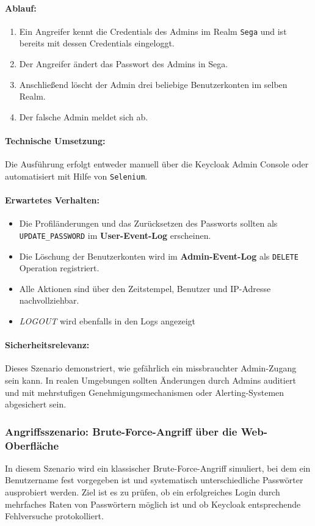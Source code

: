 \documentclass[a4paper,12pt]{article}
\begin{document}
	\paragraph{Ablauf:}
	\begin{enumerate}
		\item Ein Angreifer kennt die Credentials des Admins im Realm \texttt{Sega} und ist bereits mit dessen Credentials eingeloggt.
		\item Der Angreifer ändert das Passwort des Admins in Sega.
		\item Anschließend löscht der Admin drei beliebige Benutzerkonten im selben Realm.
		\item Der falsche Admin meldet sich ab.
	\end{enumerate}
	
	\paragraph{Technische Umsetzung:}
	Die Ausführung erfolgt entweder manuell über die Keycloak Admin Console oder automatisiert mit Hilfe von \texttt{Selenium}.
	
	\paragraph{Erwartetes Verhalten:}
	\begin{itemize}
		\item Die Profiländerungen und das Zurücksetzen des Passworts sollten als \texttt{UPDATE\_PASSWORD} im \textbf{User-Event-Log} erscheinen.
		\item Die Löschung der Benutzerkonten wird im \textbf{Admin-Event-Log} als \texttt{DELETE} Operation registriert.
		\item Alle Aktionen sind über den Zeitstempel, Benutzer und IP-Adresse nachvollziehbar.
		\item \textit{LOGOUT} wird ebenfalls in den Logs angezeigt
	\end{itemize}
	
	\paragraph{Sicherheitsrelevanz:}
	Dieses Szenario demonstriert, wie gefährlich ein missbrauchter Admin-Zugang sein kann. In realen Umgebungen sollten Änderungen durch Admins auditiert und mit mehrstufigen Genehmigungsmechanismen oder Alerting-Systemen abgesichert sein.

	\subsubsection{Angriffsszenario: Brute-Force-Angriff über die Web-Oberfläche}
	In diesem Szenario wird ein klassischer Brute-Force-Angriff simuliert, bei dem ein Benutzername fest vorgegeben ist und systematisch unterschiedliche Passwörter ausprobiert werden. Ziel ist es zu prüfen, ob ein erfolgreiches Login durch mehrfaches Raten von Passwörtern möglich ist und ob Keycloak entsprechende Fehlversuche protokolliert.
	
\end{document}
